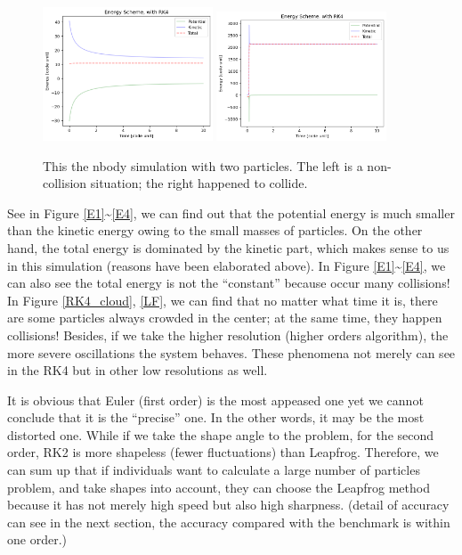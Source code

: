 \documentclass[12pt]{article}
\begin{document}
    \begin{figure}[H]
        \centering 
        \includegraphics[width = 0.45\textwidth]{./RK4/part2_no_collision.png}
        \includegraphics[width = 0.45\textwidth]{./RK4/part2_collision.png} 
        \caption{This the {\ttfamily nbody} simulation with two particles. The left is a non-collision situation; the right happened to collide.}
        \label{collision}
    \end{figure}

    See in Figure \ref{E1}\textasciitilde\ref{E4}, we can find out that the potential energy is much smaller than the kinetic energy owing to the small masses of particles. On the other hand, the total energy is dominated by the kinetic part, which makes sense to us in this simulation (reasons have been elaborated above). In Figure \ref{E1}\textasciitilde\ref{E4}, we can also see the total energy is not the ``constant'' because occur many collisions! In Figure \ref{RK4_cloud}, \ref{LF}, we can find that no matter what time it is, there are some particles always crowded in the center; at the same time, they happen collisions! Besides, if we take the higher resolution (higher orders algorithm), the more severe oscillations the system behaves. These phenomena not merely can see in the RK4 but in other low resolutions as well. 
    
    It is obvious that Euler (first order) is the most appeased one yet we cannot conclude that it is the ``precise'' one. In the other words, it may be the most distorted one. While if we take the shape angle to the problem, for the second order, RK2 is more shapeless (fewer fluctuations) than Leapfrog. Therefore, we can sum up that if individuals want to calculate a large number of particles problem, and take shapes into account, they can choose the Leapfrog method because it has not merely high speed but also high sharpness. (detail of accuracy can see in the next section, the accuracy compared with the benchmark is within one order.)
\end{document}

